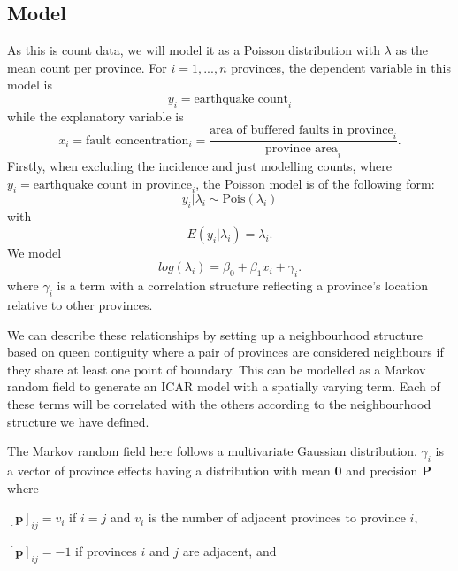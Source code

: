 \subsection{Model}\label{model}

As this is count data, we will model it as a Poisson distribution with
\(\lambda\) as the mean count per province. For \(i = 1,...,n\) provinces,
the dependent variable in this model is
\begin{equation}
y_i = \text{earthquake count}_i 
\label{eq:eq1}
\end{equation}
while the explanatory variable is
\begin{equation}
x_i = \text{fault concentration}_i = \frac{\text{area of buffered faults in province}_i} {\text{province area}_i}.
\label{eq:eq2}
\end{equation}
Firstly, when excluding the incidence and just modelling counts, where
\(y_i = \text{earthquake count in province}_i\), the Poisson model is of
the following form:
\begin{equation}
y_i | \lambda_i \sim \text{Pois}(\lambda_i)
\label{eq:eq3}
\end{equation}
with
\begin{equation}
E(y_i | \lambda_i) = \lambda_i.
\label{eq:eq4}
\end{equation}
We model
\begin{equation}
log(\lambda_i) = \beta_0 + \beta_1x_i + \gamma_i.
\label{eq:eq5}
\end{equation}
where \(\gamma_i\)
is a term with a correlation structure reflecting a province's location
relative to other provinces.

We can describe these relationships by setting up a neighbourhood
structure based on queen contiguity where a pair of provinces are
considered neighbours if they share at least one point of boundary. This can be modelled as a Markov random field to generate an ICAR model with a spatially varying term. Each of these terms will be correlated with the others according to the neighbourhood structure we have defined.

The Markov random field here follows a multivariate Gaussian
distribution. \(\gamma_i\) is a vector of province effects having a
distribution with mean \textbf{0} and precision \textbf{P} where

\([\textbf{p}]_{ij} = v_i\) if \(i=j\) and \(v_i\) is the number of adjacent provinces
to province \(i\),

\([\textbf{p}]_{ij} = -1\) if provinces \(i\) and \(j\) are adjacent, and

